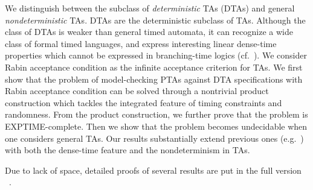 \smallskip
{} We distinguish between the subclass of \emph{deterministic} TAs (DTAs) and general \emph{nondeterministic} TAs.
DTAs are the deterministic subclass of TAs.
Although the class of DTAs is weaker than general timed automata, it can recognize a wide class of formal timed languages, and express interesting linear dense-time properties which cannot be expressed in branching-time logics (cf.~\cite{DBLP:journals/tse/DonatelliHS09}).
We consider Rabin acceptance condition as the infinite acceptance criterion for TAs.
We first show that the problem of model-checking PTAs against DTA specifications with Rabin acceptance condition
can be solved through a nontrivial product construction which tackles the integrated feature of timing constraints and randomness. From the product construction, we further prove that the problem is EXPTIME-complete.
Then we show that the problem becomes undecidable when one considers general TAs.
Our results substantially extend previous ones (e.g.~\cite{DBLP:conf/qest/Sproston11}) with both the dense-time feature and the nondeterminism in TAs.

Due to lack of space, detailed proofs of several results are put in the full version ~\cite{DBLP:journals/corr/abs-1712-00275}.



